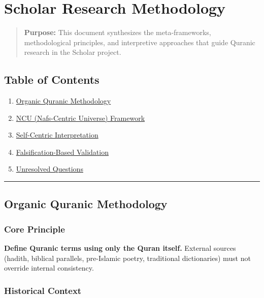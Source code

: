 \documentclass[12pt,a4paper]{article}
\providecommand{\tightlist}{\setlength{\itemsep}{0pt}\setlength{\parskip}{0pt}}
\begin{document}
\section{Scholar Research
Methodology}\label{scholar-research-methodology}

\begin{quote}
\textbf{Purpose:} This document synthesizes the meta-frameworks,
methodological principles, and interpretive approaches that guide
Quranic research in the Scholar project.
\end{quote}

\subsection{Table of Contents}\label{table-of-contents}

\begin{enumerate}
\def\labelenumi{\arabic{enumi}.}
\tightlist
\item
  \hyperref[organic-quranic-methodology]{Organic Quranic Methodology}
\item
  \hyperref[ncu-framework]{NCU (Nafs-Centric Universe) Framework}
\item
  \hyperref[self-centric-interpretation]{Self-Centric Interpretation}
\item
  \hyperref[falsification-based-validation]{Falsification-Based
  Validation}
\item
  \hyperref[unresolved-questions]{Unresolved Questions}
\end{enumerate}

\begin{center}\rule{0.5\linewidth}{0.5pt}\end{center}

\subsection{Organic Quranic
Methodology}\label{organic-quranic-methodology}

\subsubsection{Core Principle}\label{core-principle}

\textbf{Define Quranic terms using only the Quran itself.} External
sources (hadith, biblical parallels, pre-Islamic poetry, traditional
dictionaries) must not override internal consistency.

\subsubsection{Historical Context}\label{historical-context}
\end{document}
